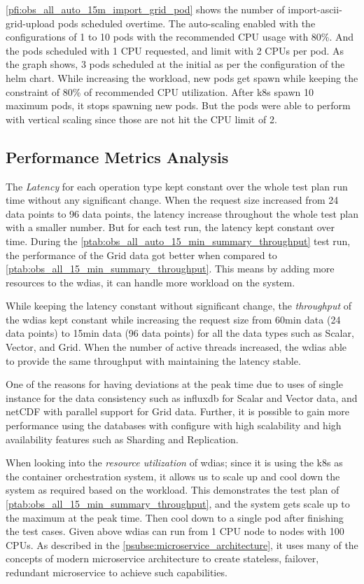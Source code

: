 \documentclass[conference]{IEEEtran}
\begin{document}
\cref{pfi:obs_all_auto_15m_import_grid_pod} shows the number of import-ascii-grid-upload pods scheduled overtime. The auto-scaling enabled with the configurations of 1 to 10 pods with the recommended CPU usage with 80\%. And the pods scheduled with 1 CPU requested, and limit with 2 CPUs per pod.
As the graph shows, 3 pods scheduled at the initial as per the configuration of the helm chart. While increasing the workload, new pods get spawn while keeping the constraint of 80\% of recommended CPU utilization. After \acrshort{k8s} spawn 10 maximum pods, it stops spawning new pods. But the pods were able to perform with vertical scaling since those are not hit the CPU limit of 2.

\subsection{Performance Metrics Analysis}
\label{psubse:performance_metrics}

The \emph{Latency} for each operation type kept constant over the whole test plan run time without any significant change. When the request size increased from 24 data points to 96 data points, the latency increase throughout the whole test plan with a smaller number. But for each test run, the latency kept constant over time.
During the \cref{ptab:obs_all_auto_15_min_summary_throughput} test run, the performance of the Grid data got better when compared to \cref{ptab:obs_all_15_min_summary_throughput}. This means by adding more resources to the \acrshort{wdias}, it can handle more workload on the system.

While keeping the latency constant without significant change, the \emph{throughput} of the \acrshort{wdias} kept constant while increasing the request size from 60min data (24 data points) to 15min data (96 data points) for all the data types such as Scalar, Vector, and Grid.
When the number of active threads increased, the \acrshort{wdias} able to provide the same throughput with maintaining the latency stable.

One of the reasons for having deviations at the peak time due to uses of single instance for the data consistency such as \acrshort{influxdb} for Scalar and Vector data, and netCDF with parallel support for Grid data. Further, it is possible to gain more performance using the databases with configure with high scalability and high availability features such as Sharding and Replication.

When looking into the \emph{resource utilization} of \acrshort{wdias}; since it is using the \acrshort{k8s} as the container orchestration system, it allows us to scale up and cool down the system as required based on the workload. This demonstrates the test plan of \cref{ptab:obs_all_15_min_summary_throughput}, and the system gets scale up to the maximum at the peak time. Then cool down to a single pod after finishing the test cases.
Given above \acrshort{wdias} can run from 1 CPU node to nodes with 100 CPUs. As described in the \cref{psubse:microservice_architecture}, it uses many of the concepts of modern microservice architecture to create stateless, failover, redundant microservice to achieve such capabilities.
\end{document}
